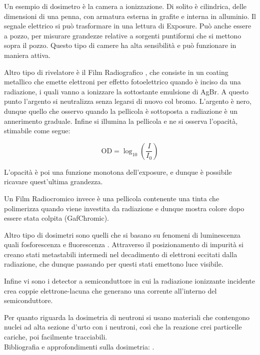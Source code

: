 Un esempio di dosimetro è la camera a ionizzazione. Di solito è cilindrica, delle dimensioni di una penna, con armatura esterna in grafite e interna in alluminio. Il segnale elettrico si può trasformare in una lettura di Exposure. Può anche essere a pozzo, per misurare grandezze relative a sorgenti puntiformi che si mettono sopra il pozzo. Questo tipo di camere ha alta sensibilità e può funzionare in maniera attiva.

Altro tipo di rivelatore è il Film Radiografico \cite{Films}, che consiste in un coating metallico che emette elettroni per effetto fotoelettrico quando è inciso da una radiazione, i quali vanno a ionizzare la sottostante emulsione di AgBr. A questo punto l'argento si neutralizza senza legarsi di nuovo col bromo. L'argento è nero, dunque quello che osservo quando la pellicola è sottoposta a radiazione è un annerimento graduale.
Infine si illumina la pellicola e ne si osserva l'opacità, stimabile come segue:

\begin{equation}
\text{OD}=\log_{10}\left(\frac{I}{I_0}\right)
\end{equation}

L'opacità è poi una funzione monotona dell'exposure, e dunque è possibile ricavare quest'ultima grandezza.

Un Film Radiocromico invece è una pellicola contenente una tinta che polimerizza quando viene investita da radiazione e dunque mostra colore dopo essere stata colpita (GafChromic).

Altro tipo di dosimetri sono quelli che si basano su fenomeni di luminescenza quali fosforescenza e fluorescenza \cite{TLD}. Attraverso il posizionamento di impurità si creano stati metastabili intermedi nel decadimento di elettroni eccitati dalla radiazione, che dunque passando per questi stati emettono luce visibile.

Infine vi sono i detector a semiconduttore in cui la radiazione ionizzante incidente crea coppie elettrone-lacuna che generano una corrente all'interno del semiconduttore.

Per quanto riguarda la dosimetria di neutroni si usano materiali che contengono nuclei ad alta sezione d'urto con i neutroni, così che la reazione crei particelle cariche, poi facilmente tracciabili. \\

Bibliografia e approfondimenti sulla dosimetria: \cite{Corvisiero2} \cite{Beringer3} \cite{Laitano}.
